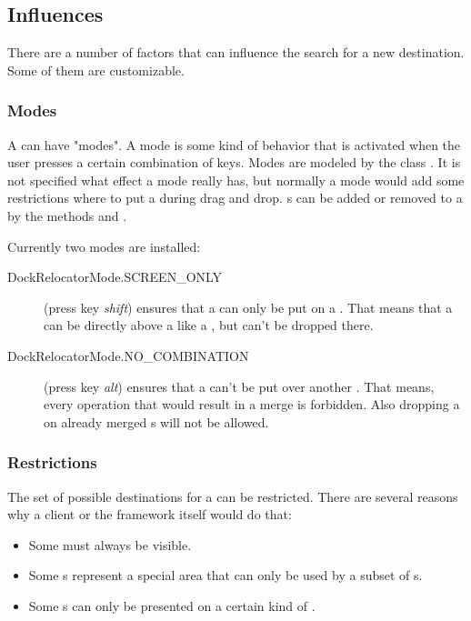 \subsection{Influences}
There are a number of factors that can influence the search for a new destination. Some of them are customizable.

\subsubsection{Modes}
A  can have "modes". A mode is some kind of behavior that is activated when the user presses a certain combination of keys. Modes are modeled by the class . It is not specified what effect a mode really has, but normally a mode would add some restrictions where to put a  during drag and drop. s can be added or removed to a  by the methods  and .

Currently two modes are installed:
\begin{description}
\item[DockRelocatorMode.SCREEN\_ONLY] (press key \textit{shift}) ensures that a \linebreak {} can only be put on a . That means that a  can be directly above a  like a , but can't be dropped there.
\item[DockRelocatorMode.NO\_COMBINATION] (press key \textit{alt}) ensures that a  can't be put over another . That means, every operation that would result in a merge is forbidden. Also dropping a  on already merged s will not be allowed.
\end{description}


\subsubsection{Restrictions}
The set of possible destinations for a  can be restricted. There are several reasons why a client or the framework itself would do that:
\begin{itemize}
 \item Some  must always be visible.
 \item Some s represent a special area that can only be used by a subset of s.
 \item Some s can only be presented on a certain kind of .
\end{itemize}

